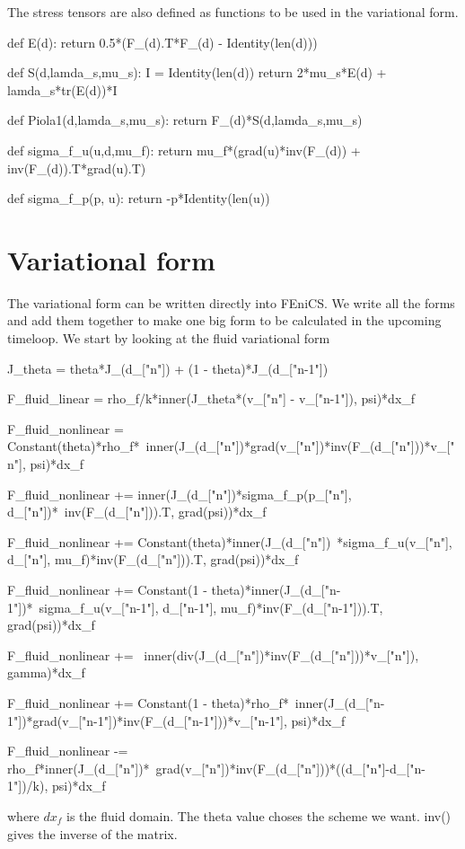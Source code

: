The stress tensors are also defined as functions to be used in the variational form.

\begin{python}
def E(d):
	return 0.5*(F_(d).T*F_(d) - Identity(len(d)))

def S(d,lamda_s,mu_s):
    I = Identity(len(d))
    return 2*mu_s*E(d) + lamda_s*tr(E(d))*I

def Piola1(d,lamda_s,mu_s):
	return F_(d)*S(d,lamda_s,mu_s)
	
def sigma_f_u(u,d,mu_f):
    return  mu_f*(grad(u)*inv(F_(d)) + inv(F_(d)).T*grad(u).T)

def sigma_f_p(p, u):
    return -p*Identity(len(u))
    
\end{python}

\section{Variational form}

The variational form can be written directly into FEniCS. We write all the forms and add them together to make one big form to be calculated in the upcoming timeloop. We start by looking at the fluid variational form
\begin{python}
J_theta = theta*J_(d_["n"]) + (1 - theta)*J_(d_["n-1"])

F_fluid_linear = rho_f/k*inner(J_theta*(v_["n"] - v_["n-1"]), psi)*dx_f

F_fluid_nonlinear =  Constant(theta)*rho_f*\
inner(J_(d_["n"])*grad(v_["n"])*inv(F_(d_["n"]))*v_["n"], psi)*dx_f

F_fluid_nonlinear += inner(J_(d_["n"])*sigma_f_p(p_["n"], d_["n"])*\
inv(F_(d_["n"])).T, grad(psi))*dx_f

F_fluid_nonlinear += Constant(theta)*inner(J_(d_["n"])\
*sigma_f_u(v_["n"], d_["n"], mu_f)*inv(F_(d_["n"])).T, grad(psi))*dx_f

F_fluid_nonlinear += Constant(1 - theta)*inner(J_(d_["n-1"])*\
sigma_f_u(v_["n-1"], d_["n-1"], mu_f)*inv(F_(d_["n-1"])).T, grad(psi))*dx_f

F_fluid_nonlinear += \
inner(div(J_(d_["n"])*inv(F_(d_["n"]))*v_["n"]), gamma)*dx_f

F_fluid_nonlinear += Constant(1 - theta)*rho_f*\
inner(J_(d_["n-1"])*grad(v_["n-1"])*inv(F_(d_["n-1"]))*v_["n-1"], psi)*dx_f

F_fluid_nonlinear -= rho_f*inner(J_(d_["n"])*\
grad(v_["n"])*inv(F_(d_["n"]))*((d_["n"]-d_["n-1"])/k), psi)*dx_f
\end{python}
where $dx_f$ is the fluid domain. The theta value choses the scheme we want. inv() gives the inverse of the matrix. 


